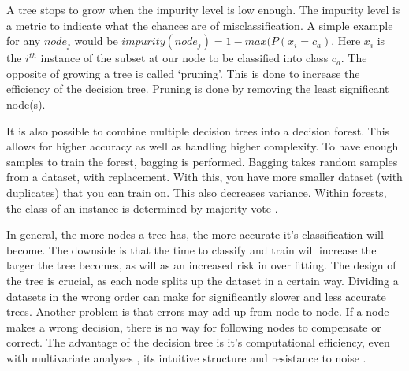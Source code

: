 A tree stops to grow when the impurity level is low enough. The impurity level is a metric to indicate what the chances are of misclassification. A simple example for any $node_j$ would be $impurity(node_j) = 1 - max(P(x_i = c_a) $. Here $x_i$ is the $i^{th}$ instance of the subset at our node to be classified into class $c_a$. 
The opposite of growing a tree is called `pruning'. This is done to increase the efficiency of the decision tree. Pruning is done by removing the least significant node(s). 

It is also possible to combine multiple decision trees into a decision forest. This allows for higher accuracy as well as handling higher complexity. To have enough samples to train the forest, bagging is performed. Bagging takes random samples from a dataset, with replacement. With this, you have more smaller dataset (with duplicates) that you can train on. This also decreases variance. Within forests, the class of an instance is determined by majority vote \cite{Topouzelis201268}. 

In general, the more nodes a tree has, the more accurate it's classification will become. The downside is that the time to classify and train will increase the larger the tree becomes, as will as an increased risk in over fitting. The design of the tree is crucial, as each node splits up the dataset in a certain way. Dividing a datasets in the wrong order can make for significantly slower and less accurate trees. Another problem is that errors may add up from node to node. If a node makes a wrong decision, there is no way for following nodes to compensate or correct. The advantage of the decision tree is it's computational efficiency, even with multivariate analyses \cite{safavian1991survey}, its intuitive structure and resistance to noise \cite{LópezChau20136283}.